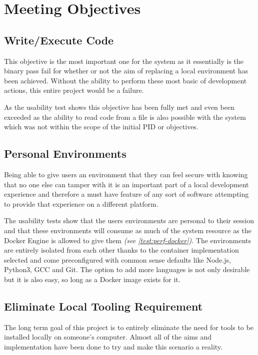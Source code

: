 \documentclass[12pt, a4paper]{extreport}
\begin{document}
\section{Meeting Objectives}

\subsection{Write/Execute Code}

This objective is the most important one for the system as it essentially is the binary pass fail for whether or not the aim of replacing a local environment has been achieved. Without the ability to perform these most basic of development actions, this entire project would be a failure. 

As the usability test shows this objective has been fully met and even been exceeded as the ability to read code from a file is also possible with the system which was not within the scope of the initial PID or objectives.

\subsection{Personal Environments}

Being able to give users an environment that they can feel secure with knowing that no one else can tamper with it is an important part of a local development experience and therefore a must have feature of any sort of software attempting to provide that experience on a different platform.

The usability tests show that the users environments are personal to their session and that these environments will consume as much of the system resource as the Docker Engine is allowed to give them \textit{(see \ref{test:perf-docker})}. The environments are entirely isolated from each other thanks to the container implementation selected and come preconfigured with common sense defaults like Node.js, Python3, GCC and Git. The option to add more languages is not only desirable but it is also easy, so long as a Docker image exists for it.

\subsection{Eliminate Local Tooling Requirement}

The long term goal of this project is to entirely eliminate the need for tools to be installed locally on someone's computer. Almost all of the aims and implementation have been done to try and make this scenario a reality.
\end{document}

